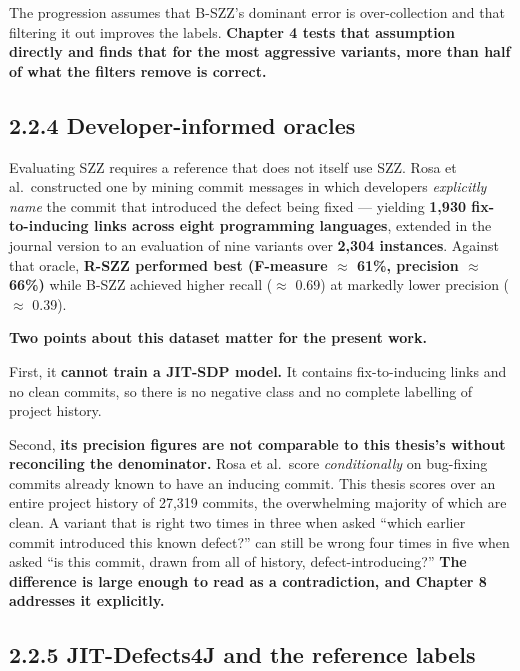 The progression assumes that B-SZZ's dominant error is over-collection
and that filtering it out improves the labels. \textbf{Chapter 4 tests
that assumption directly and finds that for the most aggressive
variants, more than half of what the filters remove is correct.}

\subsection{2.2.4 Developer-informed
oracles}\label{developer-informed-oracles}

Evaluating SZZ requires a reference that does not itself use SZZ. Rosa
et al.~constructed one by mining commit messages in which developers
\emph{explicitly name} the commit that introduced the defect being fixed
--- yielding \textbf{1,930 fix-to-inducing links across eight
programming languages}, extended in the journal version to an evaluation
of nine variants over \textbf{2,304 instances}. Against that oracle,
\textbf{R-SZZ performed best (F-measure \ensuremath{\approx} 61\%, precision \ensuremath{\approx} 66\%)} while
B-SZZ achieved higher recall (\ensuremath{\approx} 0.69) at markedly lower precision (\ensuremath{\approx}
0.39).

\textbf{Two points about this dataset matter for the present work.}

First, it \textbf{cannot train a JIT-SDP model.} It contains
fix-to-inducing links and no clean commits, so there is no negative
class and no complete labelling of project history.

Second, \textbf{its precision figures are not comparable to this
thesis's without reconciling the denominator.} Rosa et al.~score
\emph{conditionally} on bug-fixing commits already known to have an
inducing commit. This thesis scores over an entire project history of
27,319 commits, the overwhelming majority of which are clean. A variant
that is right two times in three when asked ``which earlier commit
introduced this known defect?'' can still be wrong four times in five
when asked ``is this commit, drawn from all of history,
defect-introducing?'' \textbf{The difference is large enough to read as
a contradiction, and Chapter 8 addresses it explicitly.}

\subsection{2.2.5 JIT-Defects4J and the reference
labels}\label{jit-defects4j-and-the-reference-labels}

